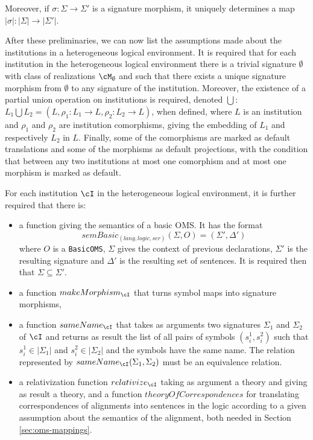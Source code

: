 \documentclass[10pt, a4paper]{isov2}
\newcommand*{\syntax}[1]{\texttt{#1}}
\begin{document}
Moreover, if $\sigma:\Sigma\to\Sigma'$ is a signature morphism,
it uniquely determines a map $|\sigma|:|\Sigma|\to|\Sigma'|$.

After these preliminaries, we can now list the assumptions made about the
institutions in a heterogeneous logical environment.
It is required that for each institution in the heterogeneous logical environment there is a trivial signature
$\emptyset$ with class of realizations $\cM_\emptyset$ and
such that there exists a unique signature morphism
from $\emptyset$ to any signature of the institution. Moreover, the existence of a partial union operation on institutions is required, denoted $\bigcup$:
$L_1 \bigcup L_2 = (L, \rho_1:L_1 \to L, \rho_2 : L_2 \to L)$, when defined, where
$L$ is an institution and $\rho_1$ and
$\rho_2$ are institution comorphisms, giving the embedding of $L_1$ and
respectively $L_2$ in $L$. Finally, some of the comorphisms are marked as default translations and some of the morphisms as default projections, with the condition that between any two institutions at most one comorphism and at most one morphism is marked as default.

For each institution $\cI$
in the heterogeneous logical environment, it is further required that
there is:
%
\begin{itemize}
  \item  a function giving the semantics of a basic OMS. It has the format
$$\mathit{semBasic}_{(lang,logic,ser)}(\Sigma,O) = (\Sigma',\Delta')$$
where $O$ is a \syntax{BasicOMS}, $\Sigma$ gives the context of previous declarations, $\Sigma'$ is the resulting
signature and $\Delta'$ is the resulting set of sentences.
 It is required then that $\Sigma\subseteq\Sigma'$.
  \item a function $makeMorphism_\cI$ that turns symbol maps into signature morphisms,
  \item a function $sameName_\cI$ that takes as arguments two signatures
  $\Sigma_1$ and $\Sigma_2$ of $\cI$
  and returns as result the list of all pairs of symbols $(s^1_i,s^2_i)$ such that
  $s^1_i\in|\Sigma_1|$ and $s^2_i\in|\Sigma_2|$ and the symbols have the same name.
  The relation represented by $sameName_\cI(\Sigma_1,\Sigma_2)$ must be an
  equivalence relation.
  \item a relativization function $relativize_\cI$
  taking as argument a theory and giving as
  result a theory, and a function
  $theoryOfCorrespondences$ for translating correspondences of alignments
  into sentences in the logic according to a given assumption about the
  semantics of the alignment, both needed in Section \ref{sec:oms-mappings}.
\end{itemize}
\end{document}
